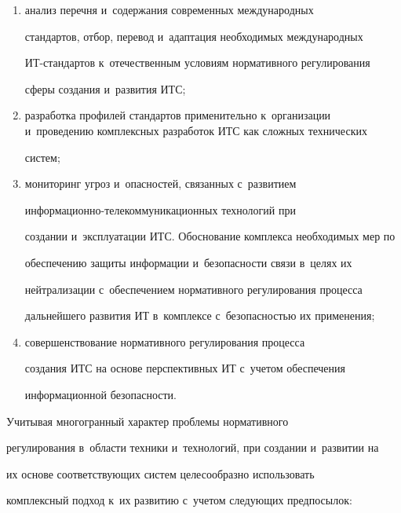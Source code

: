       \begin{enumerate}[(1)]


      \item анализ перечня и~содержания современных международных 


стандартов, отбор, перевод и~адаптация необходимых международных  


ИТ-стан\-дар\-тов к~отечественным условиям нормативного регулирования 


сферы создания и~развития ИТС;


      \item разработка профилей стандартов применительно к~организации и~проведению комплексных разработок ИТС как сложных технических 


систем;


      \item мониторинг угроз и~опасностей, связанных с~развитием  


ин\-фор\-ма\-ци\-он\-но-те\-ле\-ком\-му\-ни\-ка\-ци\-он\-ных технологий при 


создании и~эксплуатации ИТС. Обоснование комплекса необходимых мер по 


обеспечению защиты информации и~безопасности связи в~целях их 


нейтрализации с~обеспечением нормативного регулирования процесса 


дальнейшего развития ИТ в~комплексе с~без\-опас\-ностью их применения;


      \item  совершенствование нормативного регулирования процесса 


создания ИТС на основе перспективных ИТ с~учетом обеспечения 


информационной без\-опас\-ности. 


      \end{enumerate}


      


      Учитывая многогранный характер проблемы нормативного 


регулирования в~области техники и~технологий, при создании и~развитии на 


их основе соответствующих систем целесообразно использовать 


комплексный подход к~их развитию с~учетом следующих предпосылок:


